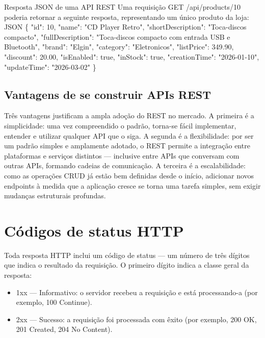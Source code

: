 \begin{infobox}{Resposta JSON de uma API REST}
Uma requisição GET /api/products/10 poderia retornar a seguinte resposta, representando um único produto da loja: JSON \{ "id": 10, "name": "CD Player Retro", "shortDescription": "Toca-discos compacto", "fullDescription": "Toca-discos compacto com entrada USB e Bluetooth", "brand": "Elgin", "category": "Eletronicos", "listPrice": 349.90, "discount": 20.00, "isEnabled": true, "inStock": true, "creationTime": "2026-01-10", "updateTime": "2026-03-02" \}
\end{infobox}

\subsection{Vantagens de se construir APIs REST}

Três vantagens justificam a ampla adoção do REST no mercado. A primeira é a simplicidade: uma vez compreendido o padrão, torna-se fácil implementar, entender e utilizar qualquer API que o siga. A segunda é a flexibilidade: por ser um padrão simples e amplamente adotado, o REST permite a integração entre plataformas e serviços distintos — inclusive entre APIs que conversam com outras APIs, formando cadeias de comunicação. A terceira é a escalabilidade: como as operações CRUD já estão bem definidas desde o início, adicionar novos endpoints à medida que a aplicação cresce se torna uma tarefa simples, sem exigir mudanças estruturais profundas.

\section{Códigos de status HTTP}

Toda resposta HTTP inclui um código de status — um número de três dígitos que indica o resultado da requisição. O primeiro dígito indica a classe geral da resposta:

\begin{itemize}
  \item 1xx — Informativo: o servidor recebeu a requisição e está processando-a (por exemplo, 100 Continue).
\end{itemize}

\begin{itemize}
  \item 2xx — Sucesso: a requisição foi processada com êxito (por exemplo, 200 OK, 201 Created, 204 No Content).
\end{itemize}

